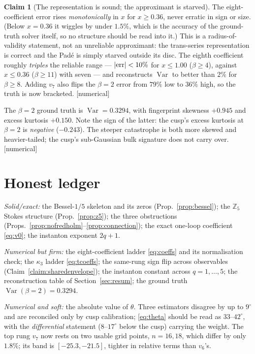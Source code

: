 \documentclass[11pt,reqno]{amsart}
\theoremstyle{plain}
\theoremstyle{definition}
\newtheorem{claim}[theorem]{Claim}
\theoremstyle{remark}
\DeclareMathOperator{\Var}{Var}
\newcommand{\tagN}{{\footnotesize\textsf{[numerical]}}}
\begin{document}
\begin{claim}[The representation is sound; the approximant is starved]\label{claim:resum}
The eight-coefficient error rises \emph{monotonically} in $x$ for $x\ge0.36$, never erratic in sign or size. (Below $x=0.36$ it wiggles by under $1.5\%$, which is the accuracy of the ground-truth solver itself, so no structure should be read into it.) This is a
radius-of-validity statement, not an unreliable approximant: the trans-series representation is
correct and the Pad\'e is simply starved outside its disc. The eighth coefficient roughly
\emph{triples} the reliable range --- $|{\rm err}|<10\%$ for $x\le1.00$ ($\beta\ge4$), against
$x\le0.36$ ($\beta\ge11$) with seven --- and reconstructs $\Var$ to better than $2\%$ for
$\beta\ge8$. Adding $v_7$ also flips the $\beta=2$ error from $79\%$ low to $36\%$ high, so the truth
is now bracketed. \tagN
\end{claim}

The $\beta=2$ ground truth is $\Var=0.3294$, with fingerprint skewness $+0.945$ and excess kurtosis
$+0.150$. Note the sign of the latter: the cusp's excess kurtosis at $\beta=2$ is \emph{negative}
($-0.243$). The steeper catastrophe is both more skewed and heavier-tailed; the cusp's sub-Gaussian
bulk signature does not carry over. \tagN

\section{Honest ledger}\label{sec:ledger}

\emph{Solid/exact:} the Bessel-$1/5$ skeleton and its zeros (Prop.~\ref{prop:bessel}); the
$\mathbb Z_5$ Stokes structure (Prop.~\ref{prop:z5}); the three obstructions
(Props.~\ref{prop:nofredholm}--\ref{prop:connection}); the exact one-loop coefficient
\eqref{eq:v0}; the instanton exponent $2q+1$.

\emph{Numerical but firm:} the eight-coefficient ladder \eqref{eq:coeffs} and its normalisation
check; the $\kappa_3$ ladder \eqref{eq:tcoeffs}; the same-rung sign flip across observables
(Claim~\ref{claim:sharedenvelope}); the instanton constant across $q=1,\dots,5$; the
reconstruction table of Section~\ref{sec:resum}; the ground truth $\Var(\beta{=}2)=0.3294$.

\emph{Numerical and soft:} the absolute value of $\theta$. Three estimators disagree by up to
$9^\circ$ and are reconciled only by cusp calibration; \eqref{eq:theta} should be read as
$33$--$42^\circ$, with the \emph{differential} statement ($8$--$17^\circ$ below the cusp) carrying
the weight. The top rung $v_7$ now rests on two usable grid points, $n=16,18$, which differ by only $1.8\%$; its band is $[-25.3,-21.5]$, tighter in relative terms than $v_6$'s.
\end{document}
